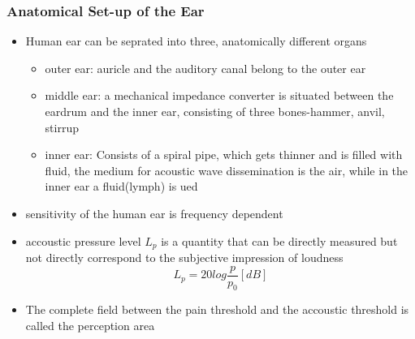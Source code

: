\documentclass{standalone}
\begin{document}
\subsubsection{Anatomical Set-up of the Ear}
\begin{itemize}
	\item Human ear can be seprated into three, anatomically different organs
		\begin{itemize}
			\item outer ear: auricle and the auditory canal belong to the outer ear
			\item middle ear: a mechanical impedance converter is situated between the eardrum and the inner ear, consisting of three bones-hammer, anvil, stirrup
			\item inner ear: Consists of a spiral pipe, which gets thinner and is filled with fluid, the medium for acoustic wave dissemination is the air, while in the inner ear a fluid(lymph) is ued
		\end{itemize}
	\item sensitivity of the human ear is frequency dependent
	\item accoustic pressure level $L_p$ is a quantity that can be directly measured but not directly correspond to the subjective impression of loudness
	\begin{equation}
	L_p = 20 log \frac{p}{p_0} [dB]
	\end{equation}
	\item The complete field between the pain threshold and the accoustic threshold is called the perception area
\end{itemize}
\end{document}
